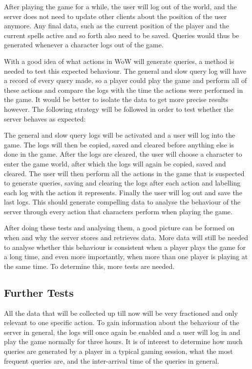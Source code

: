 After playing the game for a while, the user will log out of the world, and the server does not need to update other clients about the position of the user anymore. Any final data, such as the current position of the player and the current spells active and so forth also need to be saved. Queries would thus be generated whenever a character logs out of the game.


With a good idea of what actions in WoW will generate queries, a method is needed to test this expected behaviour. The general and slow query log will have a record of every query made, so a player could play the game and perform all of these actions and compare the logs with the time the actions were performed in the game. It would be better to isolate the data to get more precise results however. The following strategy will be followed in order to test whether the server behaves as expected:

The general and slow query logs will be activated and a user will log into the game. The logs will then be copied, saved and cleared before anything else is done in the game. After the logs are cleared, the user will choose a character to enter the game world, after which the logs will again be copied, saved and cleared. The user will then perform all the actions in the game that is suspected to generate queries, saving and clearing the logs after each action and labelling each log with the action it represents. Finally the user will log out and save the last logs. This should generate compelling data to analyse the behaviour of the server through every action that characters perform when playing the game.

After doing these tests and analysing them, a good picture can be formed on when and why the server stores and retrieves data. More data will still be needed to analyse whether this behaviour is consistent when a player plays the game for a long time, and even more importantly, when more than one player is playing at the same time. To determine this, more tests are needed.


\subsection{Further Tests} %
\label{further}

All the data that will be collected up till now will be very fractioned and only relevant to one specific action. To gain information about the behaviour of the server in general, the logs will once again be enabled and a user will log in and play the game normally for three hours. It is of interest to determine how much queries are generated by a player in a typical gaming session, what the most frequent queries are, and the inter-arrival time of the queries in general. 

